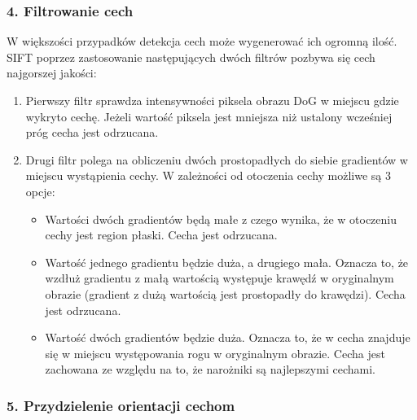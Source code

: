 \subsubsection{4. Filtrowanie cech}
\label{sec:proponowane_algorytmy:filtracja_cech}

W większości przypadków detekcja cech może wygenerować ich ogromną ilość. SIFT poprzez zastosowanie następujących dwóch filtrów pozbywa się cech najgorszej jakości:

\begin{enumerate}
\item Pierwszy filtr sprawdza intensywności piksela obrazu DoG w miejscu gdzie wykryto cechę. Jeżeli wartość piksela jest mniejsza niż ustalony wcześniej próg cecha jest odrzucana.
\item Drugi filtr polega na obliczeniu dwóch prostopadłych do siebie gradientów w miejscu wystąpienia cechy. W zależności od otoczenia cechy możliwe są 3 opcje:
  \begin{itemize}
  \item Wartości dwóch gradientów będą małe z czego wynika, że w otoczeniu cechy jest region płaski. Cecha jest odrzucana.
  \item Wartość jednego gradientu będzie duża, a drugiego mała. Oznacza to, że wzdłuż gradientu z małą wartością występuje krawędź w oryginalnym obrazie (gradient z dużą wartością jest prostopadły do krawędzi). Cecha jest odrzucana.
  \item Wartość dwóch gradientów będzie duża. Oznacza to, że w cecha znajduje się w miejscu występowania rogu w oryginalnym obrazie. Cecha jest zachowana ze względu na to, że narożniki są najlepszymi cechami.
  \end{itemize}
\end{enumerate}

\subsubsection{5. Przydzielenie orientacji cechom}
\label{sec:proponowane_algorytmy:orientacja}

